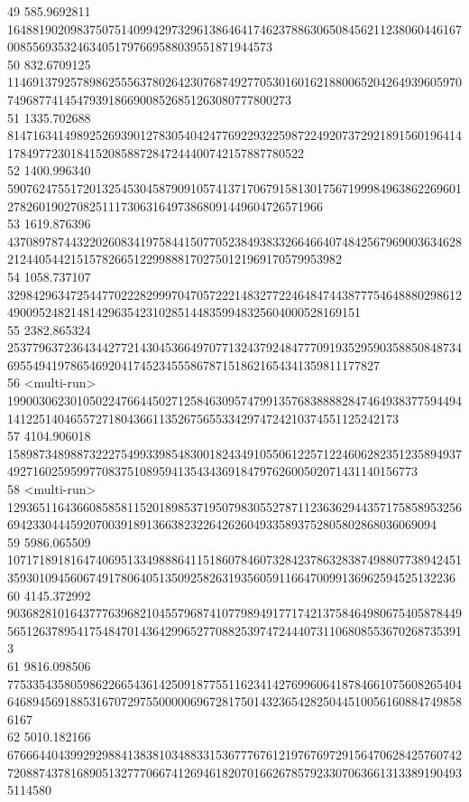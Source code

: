 \documentclass[10pt]{article}
\begin{document}
{49	585.9692811	164881902098375075140994297329613864641746237886306508456211238060446167008556935324634051797669588039551871944573\\
50	832.6709125	114691379257898625556378026423076874927705301601621880065204264939605970749687741454793918669008526851263080777800273\\
51	1335.702688	81471634149892526939012783054042477692293225987224920737292189156019641417849772301841520858872847244400742157887780522\\
52	1400.996340	59076247551720132545304587909105741371706791581301756719998496386226960127826019027082511173063164973868091449604726571966\\
53	1619.876396	43708978744322026083419758441507705238493833266466407484256796900363462821244054421515782665122998881702750121969170579953982\\
54	1058.737107	32984296347254477022282999704705722214832772246484744387775464888029861249009524821481429635423102851448359948325604000528169151\\
55	2382.865324	25377963723643442772143045366497077132437924847770919352959035885084873469554941978654692041745234555867871518621654341359811177827\\
56	<multi-run>	19900306230105022476644502712584630957479913576838888284746493837759449414122514046557271804366113526756553342974724210374551125242173\\
57	4104.906018	15898734898873222754993398548300182434910550612257122460628235123589493749271602595997708375108959413543436918479762600502071431140156773\\
58	<multi-run>	12936511643660858581152018985371950798305527871123636294435717585895325669423304445920700391891366382322642626049335893752805802868036069094\\
59	5986.065509	10717189181647406951334988864115186078460732842378632838749880773894245135930109456067491780640513509258263193560591166470099136962594525132236\\
60	4145.372992	9036828101643777639682104557968741077989491771742137584649806754058784495651263789541754847014364299652770882539747244407311068085536702687353913\\
61	9816.098506	7753354358059862266543614250918775511623414276996064187846610756082654046468945691885316707297550000069672817501432365428250445100561608847498586167\\
62	5010.182166	6766644043992929884138381034883315367776761219767697291564706284257607427208874378168905132777066741269461820701662678579233070636613133891904935114580\\
}
\end{document}
